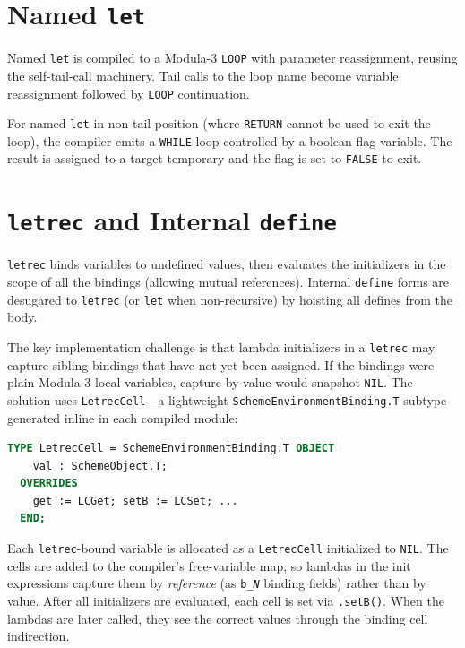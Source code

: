 \documentclass[12pt]{report}
\begin{document}
\section{Named \texttt{let}}
\label{sec:gap-named-let}

Named \texttt{let} is compiled to a Modula-3 \texttt{LOOP} with
parameter reassignment, reusing the self-tail-call machinery.
Tail calls to the loop name become variable reassignment followed
by \texttt{LOOP} continuation.

For named \texttt{let} in non-tail position (where \texttt{RETURN}
cannot be used to exit the loop), the compiler emits a
\texttt{WHILE} loop controlled by a boolean flag variable.  The
result is assigned to a target temporary and the flag is set to
\texttt{FALSE} to exit.

\section{\texttt{letrec} and Internal \texttt{define}}
\label{sec:gap-letrec}

\texttt{letrec} binds variables to undefined values, then evaluates
the initializers in the scope of all the bindings (allowing mutual
references).  Internal \texttt{define} forms are desugared to
\texttt{letrec} (or \texttt{let} when non-recursive) by hoisting
all defines from the body.

The key implementation challenge is that lambda initializers in a
\texttt{letrec} may capture sibling bindings that have not yet been
assigned.  If the bindings were plain Modula-3 local variables,
capture-by-value would snapshot \texttt{NIL}.  The solution uses
\texttt{LetrecCell}---a lightweight \texttt{SchemeEnvironmentBinding.T}
subtype generated inline in each compiled module:

\begin{lstlisting}[language=Modula3]
TYPE LetrecCell = SchemeEnvironmentBinding.T OBJECT
    val : SchemeObject.T;
  OVERRIDES
    get := LCGet; setB := LCSet; ...
  END;
\end{lstlisting}

Each \texttt{letrec}-bound variable is allocated as a
\texttt{LetrecCell} initialized to \texttt{NIL}.  The cells are
added to the compiler's free-variable map, so lambdas in the
init expressions capture them by \emph{reference} (as
\texttt{b\_\emph{N}} binding fields) rather than by value.
After all initializers are evaluated, each cell is set via
\texttt{.setB()}.  When the lambdas are later called, they see the
correct values through the binding cell indirection.
\end{document}
